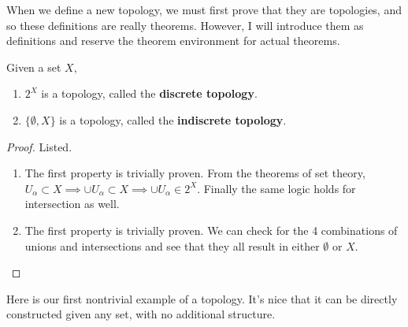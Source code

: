   When we define a new topology, we must first prove that they are topologies, and so these definitions are really theorems. However, I will introduce them as definitions and reserve the theorem environment for actual theorems. 

  \begin{definition}
    Given a set $X$, 
    \begin{enumerate}
      \item $2^X$ is a topology, called the \textbf{discrete topology}. 
      \item $\{\emptyset, X \}$ is a topology, called the \textbf{indiscrete topology}. 
    \end{enumerate}
  \end{definition}
  \begin{proof}
    Listed. 
    \begin{enumerate}
      \item The first property is trivially proven. From the theorems of set theory, $U_\alpha \subset X \implies \cup U_\alpha \subset X \implies \cup U_\alpha \in 2^X$. Finally the same logic holds for intersection as well. 
      \item The first property is trivially proven. We can check for the 4 combinations of unions and intersections and see that they all result in either $\emptyset$ or $X$. 
    \end{enumerate}
  \end{proof}

  Here is our first nontrivial example of a topology. It's nice that it can be directly constructed given any set, with no additional structure. 

